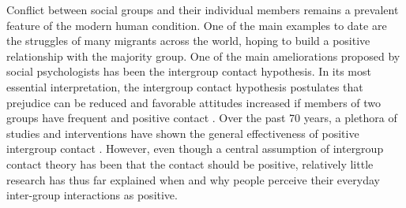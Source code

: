 \documentclass[man, 12pt, a4paper]{apa7}
\theoremstyle{break}
\theoremstyle{plain}
\begin{document}
%
%
%

Conflict between social groups and their individual members remains a prevalent feature of the modern human condition. One of the main examples to date are the struggles of many migrants across the world, hoping to build a positive relationship with the majority group. One of the main ameliorations proposed by social psychologists has been the intergroup contact hypothesis. In its most essential interpretation, the intergroup contact hypothesis postulates that prejudice can be reduced and favorable attitudes increased if members of two groups have frequent and positive contact \citep[e.g.,][]{Allport1954b, Hewstone1996, Pettigrew1998}. Over the past 70 years, a plethora of studies and interventions have shown the general effectiveness of positive intergroup contact \citep[e.g.,][]{Pettigrew2006}. However, even though a central assumption of intergroup contact theory has been that the contact should be positive, relatively little research has thus far explained when and why people perceive their everyday inter-group interactions as positive.
\end{document}
